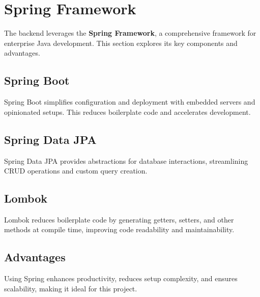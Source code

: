 \Author{\daAuthorThree}

\usepackage{amsmath}



    \section{Spring Framework}
    The backend leverages the \textbf{Spring Framework}, a comprehensive framework for enterprise Java development. This section explores its key components and advantages.

    \subsection{Spring Boot}
    Spring Boot simplifies configuration and deployment with embedded servers and opinionated setups. This reduces boilerplate code and accelerates development.

    \subsection{Spring Data JPA}
    Spring Data JPA provides abstractions for database interactions, streamlining CRUD operations and custom query creation.

    \subsection{Lombok}
    Lombok reduces boilerplate code by generating getters, setters, and other methods at compile time, improving code readability and maintainability.

    \subsection{Advantages}
    Using Spring enhances productivity, reduces setup complexity, and ensures scalability, making it ideal for this project.

